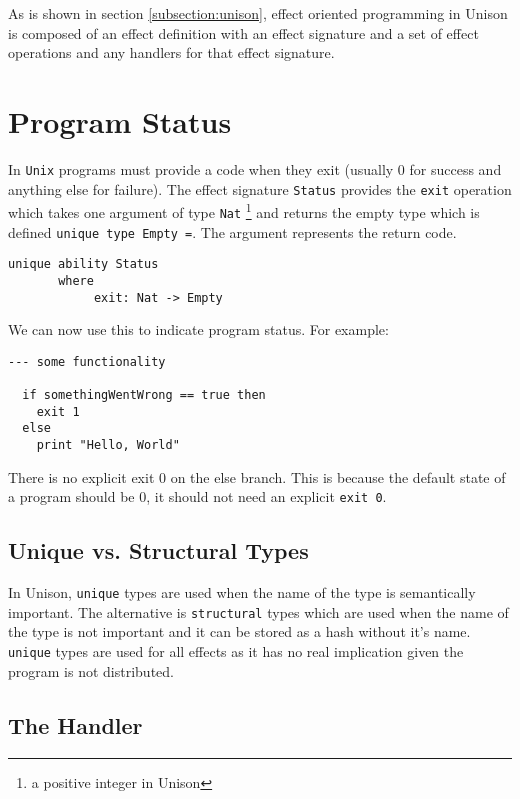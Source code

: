 \documentclass[logo,bsc,singlespacing,parskip]{infthesis}
\begin{document}
As is shown in section \ref{subsection:unison}, effect oriented programming in
Unison is composed of an effect definition with an effect signature and a set
of effect operations and any handlers for that effect signature.

\section{Program Status}
\label{status}

In \texttt{Unix} programs must provide a code when they exit (usually 0 for
success and anything else for failure). The effect signature \texttt{Status}
provides the \texttt{exit} operation which takes one argument of type
\texttt{Nat} \footnote{a positive integer in Unison} and returns the empty type
which is defined \texttt{unique type Empty =}. The argument represents the
return code.

\begin{lstlisting}[language=unison]
unique ability Status
       where
            exit: Nat -> Empty
\end{lstlisting}

We can now use this to indicate program status. For example:

\begin{lstlisting}[language=unison]
  --- some functionality 

  if somethingWentWrong == true then
    exit 1
  else
    print "Hello, World"
\end{lstlisting}

There is no explicit exit 0 on the else branch. This is because the default
state of a program should be 0, it should not need an explicit \texttt{exit 0}.

\subsection{Unique vs. Structural Types}

In Unison, \texttt{unique} types are used when the name of the type is
semantically important. The alternative is \texttt{structural} types which are
used when the name of the type is not important and it can be stored as a hash
without it's name. \texttt{unique} types are used for all effects as it has no
real implication given the program is not distributed.

\subsection{The Handler}
\end{document}
